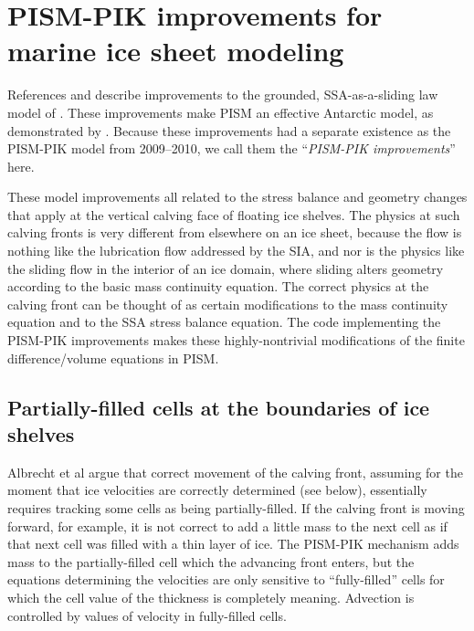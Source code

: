 
\section{PISM-PIK improvements for marine ice sheet modeling}
\label{sec:pism-pik}

References \cite{Albrechtetal2011} and \cite{Winkelmannetal2010TCD} describe improvements to the grounded, SSA-as-a-sliding law model of \cite{BBssasliding}.  These improvements make PISM an effective Antarctic model, as demonstrated by \cite{Martinetal2010TCD,Levermann2011}.  Because these improvements had a separate existence as the PISM-PIK model from 2009--2010, we call them the ``\emph{PISM-PIK improvements}'' here.

These model improvements all related to the stress balance and geometry changes that apply at the vertical calving face of floating ice shelves.  The physics at such calving fronts is very different from elsewhere on an ice sheet, because the flow is nothing like the lubrication flow addressed by the SIA, and nor is the physics like the sliding flow in the interior of an ice domain, where sliding alters geometry according to the basic mass continuity equation.  The correct physics at the calving front can be thought of as certain modifications to the mass continuity equation and to the SSA stress balance equation.  The code implementing the PISM-PIK improvements makes these highly-nontrivial modifications of the finite difference/volume equations in PISM.

\subsection{Partially-filled cells at the boundaries of ice shelves}
\label{sec:part-grid}

Albrecht et al \cite{Albrechtetal2011} argue that correct movement of the calving front, assuming for the moment that ice velocities are correctly determined (see below), essentially requires tracking some cells as being partially-filled.  If the calving front is moving forward, for example, it is not correct to add a little mass to the next cell as if that next cell was filled with a thin layer of ice.  The PISM-PIK mechanism adds mass to the partially-filled cell which the advancing front enters, but the equations determining the velocities are only sensitive to ``fully-filled'' cells for which the cell value of the thickness is completely meaning.  Advection is controlled by values of velocity in fully-filled cells.

